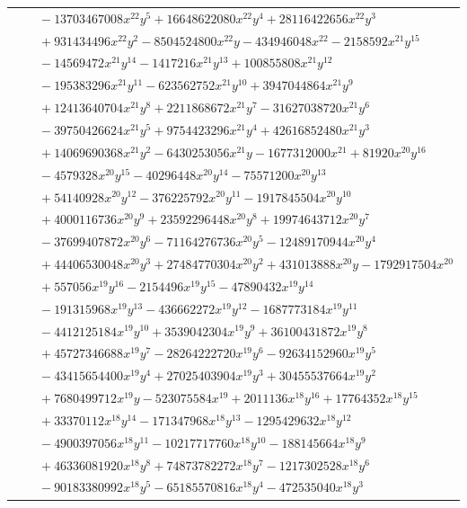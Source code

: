 \documentclass[11pt]{article}
\begin{document}
\begin{longtable}{@{}ll@{}}
 & $\quad -13703467008x^{22}y^{5}+16648622080x^{22}y^{4}+28116422656x^{22}y^{3}$\\
 & $\quad +931434496x^{22}y^{2}-8504524800x^{22}y-434946048x^{22}-2158592x^{21}y^{15}$\\
 & $\quad -14569472x^{21}y^{14}-1417216x^{21}y^{13}+100855808x^{21}y^{12}$\\
 & $\quad -195383296x^{21}y^{11}-623562752x^{21}y^{10}+3947044864x^{21}y^{9}$\\
 & $\quad +12413640704x^{21}y^{8}+2211868672x^{21}y^{7}-31627038720x^{21}y^{6}$\\
 & $\quad -39750426624x^{21}y^{5}+9754423296x^{21}y^{4}+42616852480x^{21}y^{3}$\\
 & $\quad +14069690368x^{21}y^{2}-6430253056x^{21}y-1677312000x^{21}+81920x^{20}y^{16}$\\
 & $\quad -4579328x^{20}y^{15}-40296448x^{20}y^{14}-75571200x^{20}y^{13}$\\
 & $\quad +54140928x^{20}y^{12}-376225792x^{20}y^{11}-1917845504x^{20}y^{10}$\\
 & $\quad +4000116736x^{20}y^{9}+23592296448x^{20}y^{8}+19974643712x^{20}y^{7}$\\
 & $\quad -37699407872x^{20}y^{6}-71164276736x^{20}y^{5}-12489170944x^{20}y^{4}$\\
 & $\quad +44406530048x^{20}y^{3}+27484770304x^{20}y^{2}+431013888x^{20}y-1792917504x^{20}$\\
 & $\quad +557056x^{19}y^{16}-2154496x^{19}y^{15}-47890432x^{19}y^{14}$\\
 & $\quad -191315968x^{19}y^{13}-436662272x^{19}y^{12}-1687773184x^{19}y^{11}$\\
 & $\quad -4412125184x^{19}y^{10}+3539042304x^{19}y^{9}+36100431872x^{19}y^{8}$\\
 & $\quad +45727346688x^{19}y^{7}-28264222720x^{19}y^{6}-92634152960x^{19}y^{5}$\\
 & $\quad -43415654400x^{19}y^{4}+27025403904x^{19}y^{3}+30455537664x^{19}y^{2}$\\
 & $\quad +7680499712x^{19}y-523075584x^{19}+2011136x^{18}y^{16}+17764352x^{18}y^{15}$\\
 & $\quad +33370112x^{18}y^{14}-171347968x^{18}y^{13}-1295429632x^{18}y^{12}$\\
 & $\quad -4900397056x^{18}y^{11}-10217717760x^{18}y^{10}-188145664x^{18}y^{9}$\\
 & $\quad +46336081920x^{18}y^{8}+74873782272x^{18}y^{7}-1217302528x^{18}y^{6}$\\
 & $\quad -90183380992x^{18}y^{5}-65185570816x^{18}y^{4}-472535040x^{18}y^{3}$\\

\end{longtable}
\end{document}
